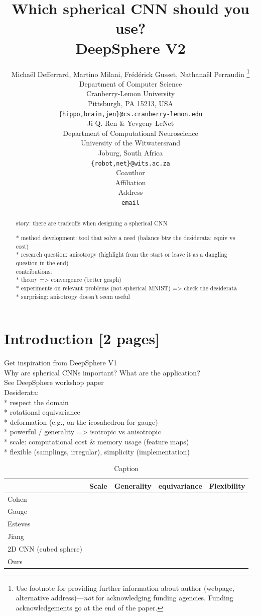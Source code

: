 \documentclass{article} %
\title{Which spherical CNN should you use?\\ DeepSphere V2}
\author{Michaël Defferrard, Martino Milani, Frédérick Gusset,  Nathanaël Perraudin \thanks{ Use footnote for providing further information about author (webpage, alternative address)---\emph{not} for acknowledging
funding agencies.  Funding acknowledgements go at the end of the paper.} \\
Department of Computer Science\\
Cranberry-Lemon University\\
Pittsburgh, PA 15213, USA \\
\texttt{\{hippo,brain,jen\}@cs.cranberry-lemon.edu} \\
\And
Ji Q. Ren \& Yevgeny LeNet \\
Department of Computational Neuroscience \\
University of the Witwatersrand \\
Joburg, South Africa \\
\texttt{\{robot,net\}@wits.ac.za} \\
\AND
Coauthor \\
Affiliation \\
Address \\
\texttt{email}
}
\begin{document}
\maketitle

\begin{abstract}

story: there are tradeoffs when designing a spherical CNN

* method development: tool that solve a need (balance btw the desiderata: equiv vs cost)\\
* research question: anisotropy (highlight from the start or leave it as a dangling question in the end)\\

contributions:\\
* theory => convergence (better graph)\\
* experiments on relevant problems (not spherical MNIST) => check the desiderata\\
  * surprising: anisotropy doesn't seem useful\\

\end{abstract}

\section{Introduction [2 pages]}
Get inspiration from DeepSphere V1\\

Why are spherical CNNs important? What are the application?\\
See DeepSphere workshop paper\\

Desiderata:\\
* respect the domain\\
  * rotational equivariance\\
  * deformation (e.g., on the icosahedron for gauge)\\
* powerful / generality => isotropic vs anisotropic\\
* scale: computational cost \& memory usage (feature maps)\\
* flexible (samplings, irregular), simplicity (implementation)\\

\begin{table}[h!]
    \centering
    \begin{tabular}{l|c|c|c|c}
         & Scale & Generality& equivariance & Flexibility \\
         \hline
        Cohen & & & &  \\
         \hline
        Gauge & & & &  \\
         \hline
        Esteves & & & &  \\
         \hline
        Jiang & & & &  \\
         \hline
        2D CNN (cubed sphere) & & & &  \\
         \hline
        Ours & & & &  \\
    \end{tabular}
    \caption{Caption}
    \label{tab:my_label}
\end{table}
\end{document}
